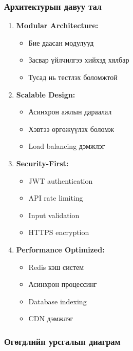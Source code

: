 \documentclass[main.tex]{subfiles}
\begin{document}
\subsubsection{Архитектурын давуу тал}

\begin{enumerate}
    \item \textbf{Modular Architecture:}
    \begin{itemize}
        \item Бие даасан модулууд
        \item Засвар үйлчилгээ хийхэд хялбар
        \item Тусад нь тестлэх боломжтой
    \end{itemize}
    
    \item \textbf{Scalable Design:}
    \begin{itemize}
        \item Асинхрон ажлын дараалал
        \item Хэвтээ өргөжүүлэх боломж
        \item Load balancing дэмжлэг
    \end{itemize}
    
    \item \textbf{Security-First:}
    \begin{itemize}
        \item JWT authentication
        \item API rate limiting
        \item Input validation
        \item HTTPS encryption
    \end{itemize}
    
    \item \textbf{Performance Optimized:}
    \begin{itemize}
        \item Redis кэш систем
        \item Асинхрон процессинг
        \item Database indexing
        \item CDN дэмжлэг
    \end{itemize}
\end{enumerate}

\subsubsection{Өгөгдлийн урсгалын диаграм}
\end{document}
